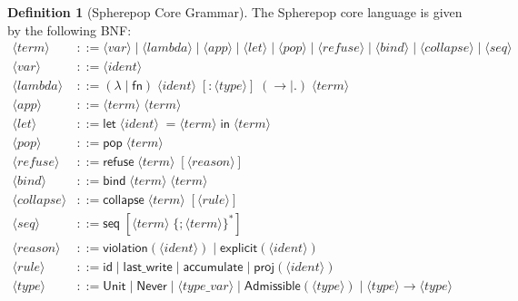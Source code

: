 \documentclass[12pt, a4paper, openany]{book}
\theoremstyle{plain}
\theoremstyle{definition}
\newtheorem{definition}[theorem]{Definition}
\theoremstyle{remark}
\newcommand{\Adm}{\mathsf{Admissible}}
\begin{document}
\begin{definition}[Spherepop Core Grammar]
The Spherepop core language is given by the following BNF:
\begin{align*}
\langle\mathit{term}\rangle &::= \langle\mathit{var}\rangle
  \mid \langle\mathit{lambda}\rangle
  \mid \langle\mathit{app}\rangle
  \mid \langle\mathit{let}\rangle
  \mid \langle\mathit{pop}\rangle
  \mid \langle\mathit{refuse}\rangle
  \mid \langle\mathit{bind}\rangle
  \mid \langle\mathit{collapse}\rangle
  \mid \langle\mathit{seq}\rangle \\
\langle\mathit{var}\rangle &::= \langle\mathit{ident}\rangle \\
\langle\mathit{lambda}\rangle &::= (\lambda \mid \mathsf{fn})\;
  \langle\mathit{ident}\rangle\; [:\langle\mathit{type}\rangle]\;
  (\to \mid .)\; \langle\mathit{term}\rangle \\
\langle\mathit{app}\rangle &::= \langle\mathit{term}\rangle\;
  \langle\mathit{term}\rangle \\
\langle\mathit{let}\rangle &::= \mathsf{let}\; \langle\mathit{ident}\rangle\;
  = \langle\mathit{term}\rangle\; \mathsf{in}\; \langle\mathit{term}\rangle \\
\langle\mathit{pop}\rangle &::= \mathsf{pop}\; \langle\mathit{term}\rangle \\
\langle\mathit{refuse}\rangle &::= \mathsf{refuse}\; \langle\mathit{term}\rangle\;
  [\langle\mathit{reason}\rangle] \\
\langle\mathit{bind}\rangle &::= \mathsf{bind}\; \langle\mathit{term}\rangle\;
  \langle\mathit{term}\rangle \\
\langle\mathit{collapse}\rangle &::= \mathsf{collapse}\;
  \langle\mathit{term}\rangle\; [\langle\mathit{rule}\rangle] \\
\langle\mathit{seq}\rangle &::= \mathsf{seq}\;
  [\langle\mathit{term}\rangle\; \{;\langle\mathit{term}\rangle\}^*] \\
\langle\mathit{reason}\rangle &::= \mathsf{violation}(\langle\mathit{ident}\rangle)
  \mid \mathsf{explicit}(\langle\mathit{ident}\rangle) \\
\langle\mathit{rule}\rangle &::= \mathsf{id} \mid \mathsf{last\_write}
  \mid \mathsf{accumulate} \mid \mathsf{proj}(\langle\mathit{ident}\rangle) \\
\langle\mathit{type}\rangle &::= \mathsf{Unit} \mid \mathsf{Never}
  \mid \langle\mathit{type\_var}\rangle
  \mid \Adm(\langle\mathit{type}\rangle)
  \mid \langle\mathit{type}\rangle \to \langle\mathit{type}\rangle
\end{align*}
\end{definition}
\end{document}
